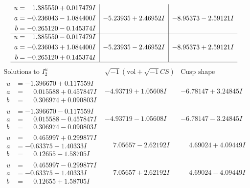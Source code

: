 \documentclass[1p]{elsarticle_modified}
\theoremstyle{definition}
\newcommand{\I}{\sqrt{-1}}
\begin{document}
$$\begin{array}{c|c|c}
\begin{aligned}
u &= \phantom{-}1.385550 + 0.017479 I \\
a &= -0.236043 - 1.084400 I \\
b &= -0.265120 - 0.145374 I\end{aligned}
 & -5.23935 + 2.46952 I & -8.95373 - 2.59121 I \\ \hline\begin{aligned}
u &= \phantom{-}1.385550 - 0.017479 I \\
a &= -0.236043 + 1.084400 I \\
b &= -0.265120 + 0.145374 I\end{aligned}
 & -5.23935 - 2.46952 I & -8.95373 + 2.59121 I\\
 \hline 
 \end{array}$$\newpage$$\begin{array}{c|c|c}  
\text{Solutions to }I^u_{2}& \I (\text{vol} + \sqrt{-1}CS) & \text{Cusp shape}\\
 \hline 
\begin{aligned}
u &= -1.396670 + 0.117559 I \\
a &= \phantom{-}0.015588 + 0.457847 I \\
b &= \phantom{-}0.306974 + 0.090803 I\end{aligned}
 & -4.93719 + 1.05608 I & -6.78147 + 3.24845 I \\ \hline\begin{aligned}
u &= -1.396670 - 0.117559 I \\
a &= \phantom{-}0.015588 - 0.457847 I \\
b &= \phantom{-}0.306974 - 0.090803 I\end{aligned}
 & -4.93719 - 1.05608 I & -6.78147 - 3.24845 I \\ \hline\begin{aligned}
u &= \phantom{-}0.465997 + 0.299877 I \\
a &= -0.63375 - 1.40333 I \\
b &= \phantom{-}0.12655 - 1.58705 I\end{aligned}
 & \phantom{-}7.05657 - 2.62192 I & \phantom{-}4.69024 + 4.09449 I \\ \hline\begin{aligned}
u &= \phantom{-}0.465997 - 0.299877 I \\
a &= -0.63375 + 1.40333 I \\
b &= \phantom{-}0.12655 + 1.58705 I\end{aligned}
 & \phantom{-}7.05657 + 2.62192 I & \phantom{-}4.69024 - 4.09449 I \\ \hline\begin{aligned}

\end{aligned}
\end{array}$$
\end{document}
